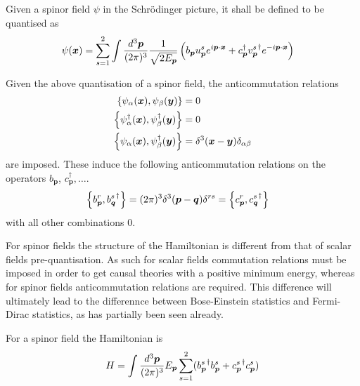 \documentclass{article}
\begin{document}
\begin{definition}
Given a spinor field $\psi$ in the Schr\"odinger picture, it shall be defined to be quantised as
\begin{align*}
\psi(\bm{x}) &= \sum_{s=1}^2 \int\tmeas  \frac{1}{\sqrt{2E_{\bm{p}}}} \left( b_{\bm{p}}u_{\bm{p}}^s e^{i\bm{p}\cdot\bm{x}} + c_{\bm{p}}^\dagger {v_{\bm{p}}^s}^\dagger e^{-i\bm{p}\cdot\bm{x}} \right) 
\end{align*}
\end{definition}

\begin{theorem}
Given the above quantisation of a spinor field, the anticommutation relations 
\begin{align*}
    \acomm[\psi_\alpha(\bm{x})]{\psi_\beta(\bm{y})} &= 0 \\
    \acomm[\psi_\alpha^\dagger(\bm{x})]{\psi_\beta^\dagger(\bm{y})} &= 0 \\
    \acomm[\psi_\alpha(\bm{x})]{\psi_\beta^\dagger(\bm{y})} &= \delta^3(\bm{x}-\bm{y})\delta_{\alpha\beta} 
\end{align*}
are imposed. These induce the following anticommutation relations on the operators $b_{\bm{p}}$, $c_{\bm{p}}^\dagger, \dots$. 
\begin{align*}
    \acomm[b_{\bm{p}}^r]{{b_{\bm{q}}^s}^\dagger} &= (2\pi)^3 \delta^3(\bm{p}-\bm{q}) \delta^{rs} = \acomm[c_{\bm{p}}^r]{{c_{\bm{q}}^s}^\dagger}
\end{align*}
with all other combinations $0$. 
\end{theorem}

\begin{idea}
For spinor fields the structure of the Hamiltonian is different from that of scalar fields pre-quantisation. As such for scalar fields commutation relations must be imposed in order to get causal theories with a positive minimum energy, whereas for spinor fields anticommutation relations are required. This difference will ultimately lead to the differennce between Bose-Einstein statistics and Fermi-Dirac statistics, as has partially been seen already. 
\end{idea}

\begin{theorem}
For a spinor field the Hamiltonian is 
\[
H=\int \tmeas E_{\bm{p}} \sum_{s=1}^2 ({b_{\bm{p}}^s}^\dagger b_{\bm{p}}^s + {c_{\bm{p}}^s}^\dagger c_{\bm{p}}^s )
\]
\end{theorem}

\end{document}
